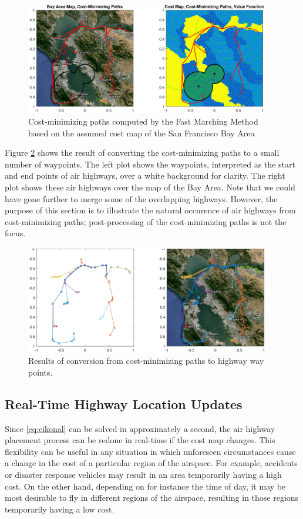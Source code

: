 \begin{figure}
	\centering
	\includegraphics[width=0.95\textwidth]{"fig/airHighway_results"}
	\caption{Cost-minimizing paths computed by the Fast Marching Method based on the assumed cost map of the San Francisco Bay Area}
	\label{fig:airHighway_results}
\end{figure}

Figure \ref{fig:airHighway_sparse} shows the result of converting the cost-minimizing paths to a small number of waypoints. The left plot shows the waypoints, interpreted as the start and end points of air highways, over a white background for clarity. The right plot shows these air highways over the map of the Bay Area. Note that we could have gone further to merge some of the overlapping highways. However, the purpose of this section is to illustrate the natural occurence of air highways from cost-minimizing paths; post-processing of the cost-minimizing paths is not the focus.

\begin{figure}
	\centering
	\includegraphics[width=0.95\textwidth]{"fig/airHighway_sparse"}
	\caption{Results of conversion from cost-minimizing paths to highway way points.}
	\label{fig:airHighway_sparse}
\end{figure}

\subsection{Real-Time Highway Location Updates}
Since \eqref{eq:eikonal} can be solved in approximately a second, the air highway placement process can be redone in real-time if the cost map changes. This flexibility can be useful in any situation in which unforeseen circumstances cause a change in the cost of a particular region of the airspace. For example, accidents or disaster response vehicles may result in an area temporarily having a high cost. On the other hand, depending on for instance the time of day, it may be most desirable to fly in different regions of the airspace, resulting in those regions temporarily having a low cost.